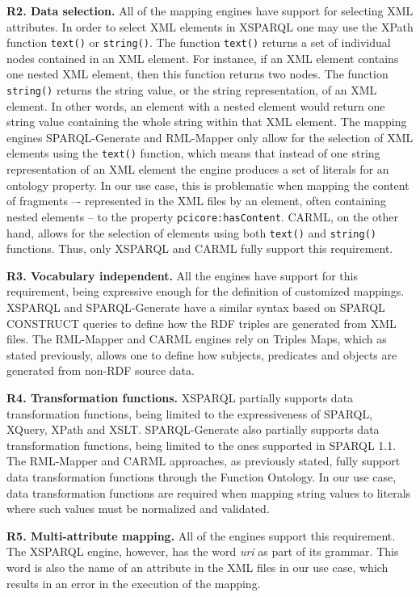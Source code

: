 \documentclass[runningheads]{llncs}
\begin{document}
\textbf{R2. Data selection.} All of the mapping engines have support for selecting XML attributes. In order to select XML elements in XSPARQL one may use the XPath function \texttt{text()} or \texttt{string()}. The function \texttt{text()} returns a set of individual nodes contained in an XML element. For instance, if an XML element contains one nested XML element, then this function returns two nodes. The function \texttt{string()} returns the string value, or the string representation, of an XML element. In other words, an element with a nested element would return one string value containing the whole string within that XML element. The mapping engines SPARQL-Generate and RML-Mapper only allow for the selection of XML elements using the \texttt{text()} function, which means that instead of one string representation of an XML element the engine produces a set of literals for an ontology property. In our use case, this is problematic when mapping the content of fragments –- represented in the XML files by an element, often containing nested elements -- to the property \texttt{pcicore:hasContent}. CARML, on the other hand, allows for the selection of elements using both \texttt{text()} and \texttt{string()} functions. Thus, only XSPARQL and CARML fully support this requirement.

\textbf{R3. Vocabulary independent.} All the engines have support for this requirement, being expressive enough for the definition of customized mappings. XSPARQL and SPARQL-Generate have a similar syntax based on SPARQL CONSTRUCT queries to define how the RDF triples are generated from XML files. The RML-Mapper and CARML engines rely on Triples Maps, which as stated previously, allows one to define how subjects, predicates and objects are generated from non-RDF source data.

\textbf{R4. Transformation functions.} XSPARQL partially supports data transformation functions, being limited to the expressiveness of SPARQL, XQuery, XPath and XSLT. SPARQL-Generate also partially supports data transformation functions, being limited to the ones supported in SPARQL 1.1. The RML-Mapper and CARML approaches, as previously stated, fully support data transformation functions through the Function Ontology. In our use case, data transformation functions are required when mapping string values to literals where such values must be normalized and validated.

\textbf{R5. Multi-attribute mapping.} All of the engines support this requirement. The XSPARQL engine, however, has the word \textit{uri} as part of its grammar. This word is also the name of an attribute in the XML files in our use case, which results in an error in the execution of the mapping.
\end{document}
